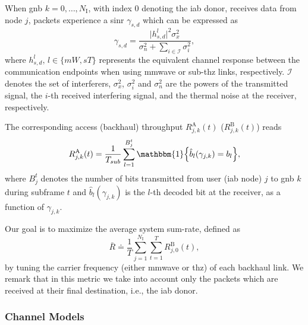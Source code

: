When \gls{gnb} $k = 0, \ldots, N_{\mathrm{I}}$, with index $0$ denoting the \gls{iab} donor, receives data from node $j$, packets experience a \gls{sinr} $\gamma_{s, d}$ which can be expressed as
\begin{equation}
\label{eq:sinr_common}
    \gamma_{s, d} = \frac{ \vert h_{s, d}^{l} \vert^2 \sigma_{x}^2 }{\sigma_{n}^2 + \sum_{i \in \mathcal{I}} \sigma_{i}^ 2}, 
\end{equation}
where $h_{s, d}^{l}, \, l \in \{mW, sT\} $ represents the equivalent channel response between the communication endpoints when using \gls{mmwave} or sub-\gls{thz} links, respectively. $\mathcal{I}$ denotes the set of interferers, $\sigma_{x}^2$, $\sigma_{i}^2$ and $\sigma_{n}^2$ are the powers of the transmitted signal, the $i$-th received interfering signal, and the thermal noise at the receiver, respectively. 

The corresponding access (backhaul) throughput $R_{j, k}^{\mathrm{A}} (t)$ ($R_{j, k}^{\mathrm{B}} (t)$) reads
\begin{equation}
  R_{j, k}^{\mathrm{A}} (t) = \frac{1}{T_{sub}} \sum_{l=1}^{B_{j}^t} \mathbbm{1} \left\{ \hat{b}_{l} (\gamma_{j, k}) = b_l \right\} ,
\end{equation}
where $B_{j}^t$ denotes the number of bits transmitted from user (\gls{iab} node) $j$ to \gls{gnb} $k$ during subframe $t$ and %
$\hat{b}_{l} (\gamma_{j, k})$ is the $l$-th decoded bit at the receiver, as a function of $\gamma_{j, k}$.

Our goal is to maximize the average system sum-rate, defined as
\begin{equation}
 \bar{R} \doteq \frac{1}{T} \sum_{j = 1}^{N_{\mathrm{I}}} \sum_{t = 1}^{T} R_{j, 0}^{\mathrm{B}} (t),
\end{equation}
%
by tuning the carrier frequency (either \gls{mmwave} or \gls{thz}) of each backhaul link. We remark that in this metric we take into account only the packets which are received at their final destination, i.e., the \gls{iab} donor.

\subsubsection{Channel Models}
\label{sub:channelmodel}
